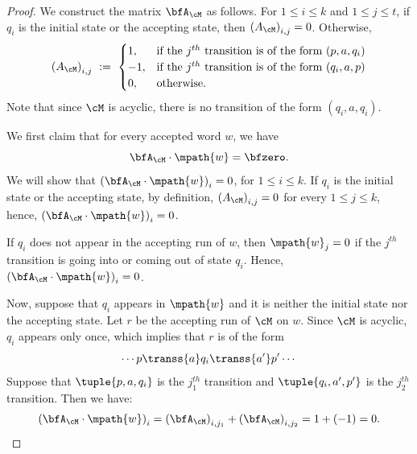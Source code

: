 \begin{proof}
    We construct the matrix $\bfA_\cM$ as follows.
    For $1 \le i \le k$ and $1 \le j \le t$,
    if $q_i$ is the initial state or the accepting state, then
    $\left(A_\cM\right)_{i, j} = 0$.
    Otherwise,
    \begin{equation*}
        \left(A_\cM\right)_{i, j}\ :=\ 
        \begin{cases}
            1,  &\text{if the $j^{th}$ transition is of the form $(p, a, q_i)$} \\
            -1, &\text{if the $j^{th}$ transition is of the form $(q_i, a, p)$} \\
            0,  &\text{otherwise}.
        \end{cases}
    \end{equation*}
    Note that since $\cM$ is acyclic, there is no transition of the form $(q_i, a, q_i)$.

    We first claim that for every accepted word $w$, 
    we have
    \begin{equation*}
        \bfA_\cM \cdot \mpath{w} = \bfzero.    
    \end{equation*}
    We will show that $\left(\bfA_\cM \cdot \mpath{w}\right)_i = 0$,    for $1 \le i \le k$.
    If $q_i$ is the initial state or the accepting state,
    by definition, $\left(A_\cM\right)_{i, j} = 0$ for every $1 \le j \le k$,
    hence, $\left(\bfA_\cM \cdot \mpath{w}\right)_i = 0$.

    If $q_i$ does not appear in the accepting run of $w$,
    then $\mpath{w}_j=0$ if
    the $j^{th}$ transition is going into or coming out of state $q_i$.
    Hence, $\left(\bfA_\cM \cdot \mpath{w}\right)_i = 0$.

    Now, suppose that $q_i$ appears in $\mpath{w}$
    and it is 
    neither the initial state nor the accepting state.
    Let $r$ be the accepting run of $\cM$ on $w$.
    Since $\cM$ is acyclic, $q_i$ appears only once, which implies that $r$ is of the form
    \begin{equation*}
        \cdots p\transs{a} q_i \transs{a'}p'\cdots
    \end{equation*}
    Suppose that
    $\tuple{p, a, q_i}$ is the $j_1^{th}$ transition and 
    $\tuple{q_i, a', p'}$ is the $j_2^{th}$ transition.
    Then we have:
    \begin{equation*}
        \left(\bfA_\cM \cdot \mpath{w}\right)_i
        =
        \left(\bfA_\cM\right)_{i, j_1} +
        \left(\bfA_\cM\right)_{i, j_2}
        = 1 + (-1)
        = 0.
    \end{equation*}


\end{proof}
